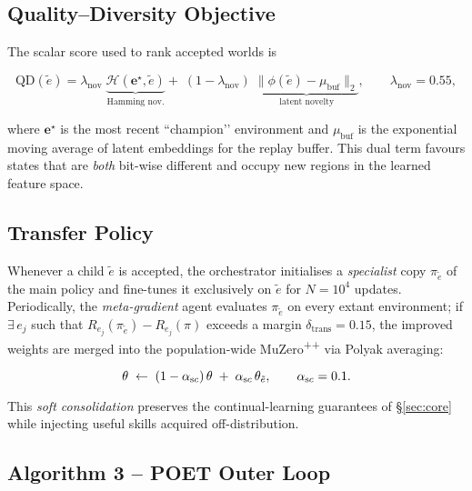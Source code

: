\subsection{Quality–Diversity Objective}\label{sec:qd}

The scalar score used to rank accepted worlds is

\begin{equation}
\mathrm{QD}(\tilde e)=
\lambda_{\text{nov}}\;
      \underbrace{\mathcal H(\mathbf e^\star,\tilde e)}_{\text{Hamming nov.}}
+\;(1-\lambda_{\text{nov}})\;
      \underbrace{
        \lVert \phi(\tilde e)-\mu_{\text{buf}}\rVert_2
      }_{\text{latent novelty}},
\qquad
\lambda_{\text{nov}}=0.55,
\end{equation}

where $\mathbf e^\star$ is the most recent “champion’’ environment and
$\mu_{\text{buf}}$ is the exponential moving average of latent embeddings
for the replay buffer.  This dual term favours states that are \emph{both}
bit-wise different and occupy new regions in the learned feature space.

\subsection{Transfer Policy}\label{sec:transfer}

Whenever a child $\tilde e$ is accepted, the orchestrator initialises a
\emph{specialist} copy $\pi_{\tilde e}$ of the main policy and fine-tunes it
exclusively on $\tilde e$ for $N=10^{4}$ updates.  Periodically, the
\emph{meta-gradient} agent evaluates $\pi_{\tilde e}$ on every extant
environment; if $\exists\,e_j$ such that
$R_{e_j}(\pi_{\tilde e})-R_{e_j}(\pi)$ exceeds a margin
$\delta_{\text{trans}}=0.15$, the improved weights are merged into the
population‐wide MuZero\textsuperscript{++} via Polyak averaging:

\[
\theta \;\leftarrow\;
(1-\alpha_{\text sc})\,\theta
\;+\;
\alpha_{\text sc}\,\theta_{\tilde e},
\qquad
\alpha_{\text sc}=0.1.
\]

This \emph{soft consolidation} preserves the continual-learning guarantees of
§\ref{sec:core} while injecting useful skills acquired off-distribution.

\subsection{Algorithm 3 – POET Outer Loop}

